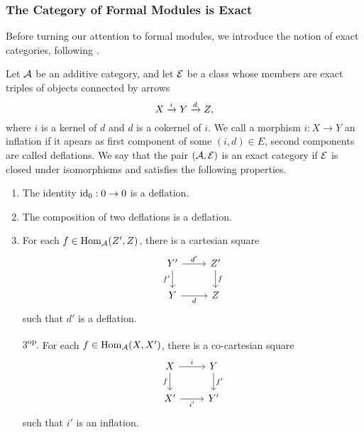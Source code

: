 \documentclass[../main.tex]{subfiles}
\begin{document}
\subsubsection{The Category of Formal Modules is Exact} %
\label{ssub:The Category of Formal Modules is Exact}
Before turning our attention to formal modules, we introduce the notion of 
exact categories, following \cite[Appendix A]{keller1990chain}.

\begin{defi}
  Let $\mathcal{A}$ be an additive category, and let $\mathcal{E}$ be a class whose
  members are exact triples of objects connected by arrows 
  \begin{equation*}
    X \xrightarrow{i} Y \xrightarrow{d} Z,
  \end{equation*}
  where $i$ is a kernel of $d$ and $d$ is a cokernel of $i$. 
  We call a morphism $i:X \to Y$ an inflation if it apears as first component
  of some $(i,d) \in E$, second components are called deflations.
  We say that the pair $(\mathcal{A}, \mathcal{E})$ is an exact category if 
  $\mathcal{E}$ is closed under isomorphisms and satisfies the following properties.
  \begin{enumerate}
    \item The identity $\operatorname{id}_0: 0 \to 0$ is a deflation.
    \item The composition of two deflations is a deflation.
    \item For each $f \in \operatorname{Hom}_{\mathcal{A}}(Z', Z)$, there is a cartesian square
    \begin{equation*}
        \begin{tikzcd}[ampersand replacement=\&]
        	{Y'} \& {Z'} \\
        	Y \& Z
        	\arrow["{d'}", from=1-1, to=1-2]
        	\arrow["{f'}"', from=1-1, to=2-1]
        	\arrow["f", from=1-2, to=2-2]
        	\arrow["d"', from=2-1, to=2-2]
        \end{tikzcd}
    \end{equation*}
    such that $d'$ is a deflation.
  \item[3\textsuperscript{op}.] For each $f \in \operatorname{Hom}_{\mathcal{A}}(X, X')$, there is a
    co-cartesian square
      \begin{equation*}
        \begin{tikzcd}[ampersand replacement=\&]
        	X \& Y \\
        	{X'} \& {Y'}
        	\arrow["i", from=1-1, to=1-2]
        	\arrow["f"', from=1-1, to=2-1]
        	\arrow["{f'}", from=1-2, to=2-2]
        	\arrow["{i'}"', from=2-1, to=2-2]
        \end{tikzcd}
      \end{equation*}
      such that $i'$ is an inflation.
  \end{enumerate}
\end{defi}
\end{document}
